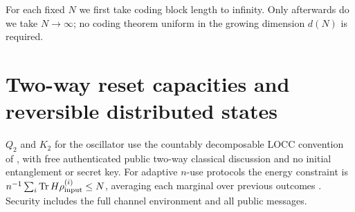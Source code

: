 \documentclass[11pt]{article}
\newcommand{\Tr}{\operatorname{Tr}}
\begin{document}
For each fixed $N$ we first take coding block length to infinity.
Only afterwards do we take $N\to\infty$; no coding theorem uniform in
the growing dimension $d(N)$ is required.

\section{Two-way reset capacities and reversible distributed states}
$Q_2$ and $K_2$ for the oscillator use the countably decomposable LOCC
convention of \cite{dsw}, with free authenticated public two-way
classical discussion and no initial entanglement or secret key.
For adaptive $n$-use protocols the energy constraint is
$n^{-1}\sum_i\Tr H\rho^{(i)}_{\rm input}\le N$, averaging each
marginal over previous outcomes \cite[equation (101)]{dsw}.
Security includes the full channel environment and all public messages.
\end{document}
